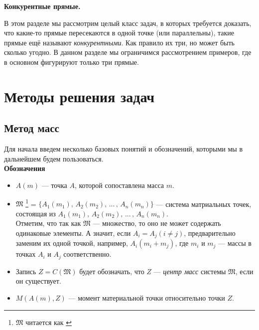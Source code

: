 \documentclass[14pt]{extarticle}
\theoremstyle{definition}
\theoremstyle{theorem}
\begin{document}
\begin{center}
	\textbf{\fontsize{23}{30}\selectfont Конкурентные прямые.}
\end{center}


В этом разделе мы рассмотрим целый класс
задач, в которых требуется доказать, что какие-то
прямые пересекаются в одной точке (или параллельны), такие прямые ещё называют
\textit{конкурентными}. Как правило их три, но может быть сколько угодно.
В данном разделе мы ограничимся рассмотрением примеров,
где в основном фигурируют только три прямые.\\


\section*{Методы решения задач}

\subsection{Метод масс}
Для начала введем несколько базовых понятий и обозначений, которыми 
мы в дальнейшем будем пользоваться.\\

{\normalfont\fontsize{16}{16} \noindent \textbf{Обозначения}}

\begin{itemize}[leftmargin=*]

\item \(A(m)\) --- точка \(A\), которой сопоставлена масса \(m\).

\item \(\mathfrak{M}\) 
\footnote{{\fontsize{12}{12} \(\mathfrak{M}\) 
\textup{читается как \textit{}}}}
= \(\big\{A_1(m_1), \, A_2(m_2),
\, ... \, , \, A_n(m_n) \big\}\) --- система матриальных точек,
состоящая из \(A_1(m_1), \, A_2(m_2), \, ... \, , \, A_n(m_n)\).\\
Отметим, что так как \(\mathfrak{M}\) --- множество, то оно не
может содержать одинаковые элементы. А значит, если 
\(A_i = A_j (i \neq j)\), предварительно заменим их одной точкой,
например, \(A_i(m_i + m_j)\), где \(m_i\) и \(m_j\) --- 
массы в точках \(A_i\) и \(A_j\) соответственно. 

\item Запись \(Z = C(\mathfrak{M})\) будет обозначать, что \(Z\) --- 
\textit{центр масс} системы \(\mathfrak{M}\), если он существует.

\item \(M(A(m), Z)\) --- момент материальной точки относительно точки \(Z\).
\end{itemize}
\end{document}
